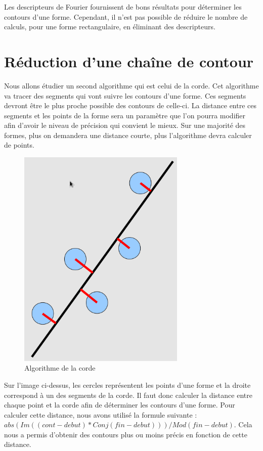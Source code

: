 \documentclass[11pt]{article}
\begin{document}
  Les descripteurs de Fourier fournissent de bons résultats pour déterminer les contours d'une forme. 
  Cependant, il n'est pas possible de réduire le nombre de calculs, pour une forme rectangulaire, 
  en éliminant des descripteurs.

  \section{Réduction d'une chaîne de contour}
  Nous allons étudier un second algorithme qui est celui de la corde.
  Cet algorithme va tracer des segments qui vont suivre les contours d'une forme. Ces segments 
  devront être le plus proche possible des contours de celle-ci. La distance entre ces segments 
  et les points de la forme sera un paramètre que l'on pourra modifier afin d'avoir le niveau de 
  précision qui convient le mieux. Sur une majorité des formes, plus on demandera une distance courte, 
  plus l'algorithme devra calculer de points.\\ 
  
  
  \begin{figure}[!h]
    \begin{center}
      \includegraphics[width=8cm]{corde.png}
    \end{center}
    \caption{Algorithme de la corde}
  \end{figure}
  
  
  Sur l'image ci-dessus, les cercles représentent les points d'une forme et la droite correspond
  à un des segments de la corde. Il faut donc calculer la distance entre chaque point et la corde
  afin de déterminer les contours d'une forme.
  Pour calculer cette distance, nous avons utilisé la formule suivante :
  $abs(Im((cont - debut) * Conj(fin - debut))) / Mod(fin - debut)$.
  Cela nous a permis d'obtenir des contours plus ou moins précis en fonction de cette distance.\\
  
\end{document}
